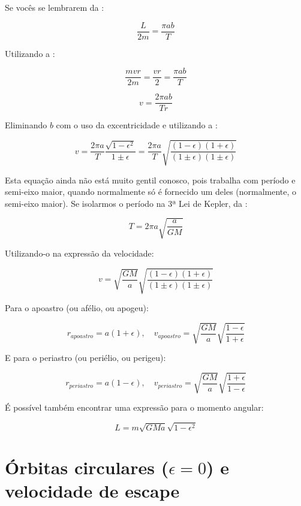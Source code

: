 Se vocês se lembrarem da :

\[
	\frac{L}{2m} = \frac{\pi ab}{T}
\]

Utilizando a :

\[
	\frac{mvr}{2m} = \frac{vr}{2} = \frac{\pi ab}{T}
\]

\[
	v = \frac{2\pi ab}{Tr}
\]

Eliminando $b$ com o uso da excentricidade e utilizando a :

\[
	v = \frac{2\pi a}{T} \frac{\sqrt{1 - \epsilon^2}}{1 \pm \epsilon}
	  = \frac{2\pi a}{T} \sqrt{\frac{(1-\epsilon)(1+\epsilon)}{(1 \pm \epsilon)(1 \pm \epsilon)}}
\]

Esta equação ainda não está muito gentil conosco, pois trabalha com período e semi-eixo maior, quando normalmente só é fornecido um deles (normalmente, o semi-eixo maior). Se isolarmos o período na 3ª Lei de Kepler, da :

\begin{equation}
	T = 2\pi a \sqrt{\frac{a}{GM}}	\label{eq70}
\end{equation}

Utilizando-o na expressão da velocidade:

\[
	v = \sqrt{\frac{GM}{a}} \sqrt{\frac{(1-\epsilon)(1+\epsilon)}{(1 \pm \epsilon)(1 \pm \epsilon)}}
\]

Para o apoastro (ou afélio, ou apogeu):

\begin{equation}
	r_{apoastro} = a (1 + \epsilon), \quad
	v_{apoastro} = \sqrt{\frac{GM}{a}} \sqrt{\frac{1-\epsilon}{1+\epsilon}}	
	\label{eq71}
\end{equation}

E para o periastro (ou periélio, ou perigeu):

\begin{equation}
	r_{periastro} = a (1 - \epsilon), \quad
	v_{periastro} = \sqrt{\frac{GM}{a}} \sqrt{\frac{1+\epsilon}{1-\epsilon}}	
	\label{eq72}
\end{equation}

É possível também encontrar uma expressão para o momento angular:

\begin{equation}
	L = m\sqrt{GMa}\sqrt{1 - \epsilon^2}		\label{eq73}
\end{equation}

\newpage

\section{Órbitas circulares ($\epsilon = 0$) e velocidade de escape}

